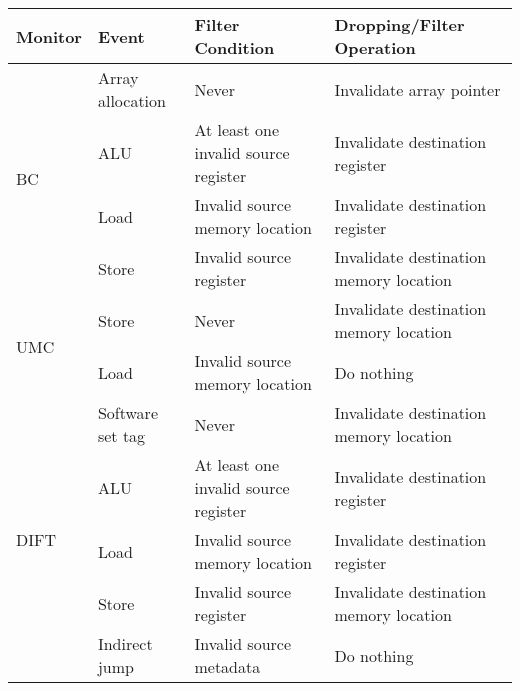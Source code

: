 

\begin{tabular}{|l|l|l|l|}
\hline

{\bf Monitor} & {\bf Event} & {\bf Filter Condition} & {\bf Dropping/Filter Operation} \\ \hline \hline

\multirow{4}{*}{BC}  
& Array allocation & Never & Invalidate array pointer \\ \cline{2-4}
& ALU   & At least one invalid source register & Invalidate destination register \\ \cline{2-4}
& Load  & Invalid source memory location & Invalidate destination register \\ \cline{2-4}
& Store & Invalid source register & Invalidate destination memory location \\
\hline\hline

\multirow{2}{*}{UMC}  
& Store & Never & Invalidate destination memory location \\ \cline{2-4}
& Load & Invalid source memory location & Do nothing \\ 
\hline\hline

\multirow{5}{*}{DIFT}  
& Software set tag & Never & Invalidate destination memory location \\ \cline{2-4}
& ALU   & At least one invalid source register & Invalidate destination register \\ \cline{2-4}
& Load  & Invalid source memory location & Invalidate destination register \\ \cline{2-4}
& Store & Invalid source register & Invalidate destination memory location \\ \cline{2-4}
& Indirect jump & Invalid source metadata & Do nothing \\ 
\hline


\end{tabular}

